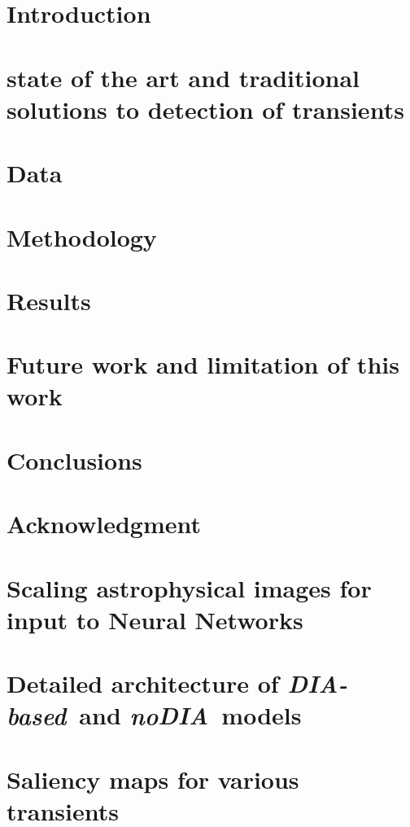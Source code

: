 \documentclass[fleqn,usenatbib]{mnras}
\newcommand{\nodia}{{\it noDIA}}
\newcommand{\diabased}{{\it DIA-based}}
\begin{document}
\section{Introduction} \label{sec:intro}


\section{state of the art and traditional solutions to detection of transients}\label{sec:stateofart}


\section{Data} \label{sec:data}


\section{Methodology}\label{sec:method}


\section{Results}\label{sec:results}


\section{Future work and limitation of this work}\label{sec:futurework}

\section{Conclusions}\label{sec:conclusion}


\clearpage
\section{Acknowledgment}\label{sec:thanks}




 
\appendix 
\onecolumn

\section{Scaling astrophysical images for input to Neural Networks}
\label{sec:appendixa}



\section{Detailed architecture of \diabased\ and \nodia\ models}
\label{sec:appendixb}


\clearpage

\section{Saliency maps for various transients}

\label{sec:appendixc}




%
\end{document}
